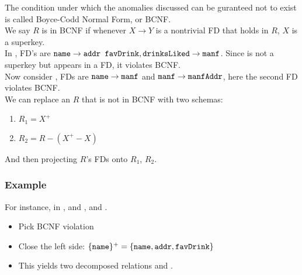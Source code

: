 \documentclass[11pt,a4paper,twocolumn]{book}
\begin{document}
The condition under which the anomalies discussed can be guranteed not to exist is called Boyce-Codd Normal Form, or BCNF.\\

We say $R$ is in BCNF if whenever $X \to Y$ is a nontrivial FD that holds in $R$, $X$ is a superkey.\\

In , FD's are $\texttt{name} \to \texttt{addr favDrink}, \texttt{drinksLiked} \to \texttt{manf}$. Since  is not a superkey but appears in a FD, it violates BCNF.\\

Now consider , FDs are $\texttt{name} \to \texttt{manf}$ and $\texttt{manf} \to \texttt{manfAddr}$, here the second FD violates BCNF.\\

We can replace an $R$ that is not in BCNF with two schemas:

\begin{enumerate}
\item $R_1 = X^+$
\item $R_2 = R -(X^+ - X)$
\end{enumerate}

And then projecting $R$'s FDs onto $R_1$, $R_2$.\\

\subsubsection{Example}

For instance, in , and ,  and .

\newcommand{\customersm}{\code{Customers(name, addr, drinksLiked, manf, favDrink)}}
\newcommand{\customerso}{\code{Customers1(name, addr, favDrink)}}
\newcommand{\customerst}{\code{Customers2(name, drinksLiked, manf)}}

\begin{itemize}
\item Pick BCNF violation 
\item Close the left side: $\{ \texttt{name} \}^+ = \{ \texttt{name}, \texttt{addr}, \texttt{favDrink} \}$
\item This yields two decomposed relations  and .
\end{itemize}
\end{document}
